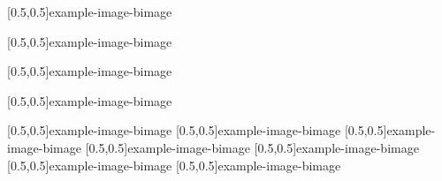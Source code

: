 



\graphicspath{{Figures/}{Figures/Iceland}}


\subtitle{Day 1}
\date{07.10.2019}


    
    
    [0.5,0.5]{example-image-b}{image}
    
    [0.5,0.5]{example-image-b}{image}
    
    [0.5,0.5]{example-image-b}{image}
    
    [0.5,0.5]{example-image-b}{image}
    
    [0.5,0.5]{example-image-b}{image}
%     
    [0.5,0.5]{example-image-b}{image}
%     
    [0.5,0.5]{example-image-b}{image}
%     
    [0.5,0.5]{example-image-b}{image}
%     
    [0.5,0.5]{example-image-b}{image}
%     
    [0.5,0.5]{example-image-b}{image}
%     
    [0.5,0.5]{example-image-b}{image}


